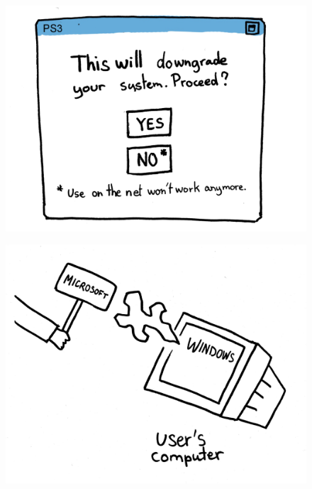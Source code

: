 \documentclass[notes,usenames,dvipsnames]{beamer}       %
\begin{document}
\begin{frame}
  \begin{figure}
    \centering
    \includegraphics[scale=0.4]{img/pr-compels}
  \end{figure}
\end{frame}


\begin{frame}
  \begin{figure}
    \centering
    \includegraphics[scale=0.8]{img/pr-remote-changes}
  \end{figure}
\end{frame}
\end{document}
